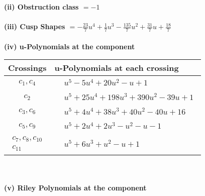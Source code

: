 \documentclass[1p]{elsarticle_modified}
\theoremstyle{definition}
\begin{document}
\flushleft \textbf{(ii) Obstruction class $= -1$}\\~\\
\flushleft \textbf{(iii) Cusp Shapes $= -\frac{23}{7} u^4+\frac{1}{7} u^3-\frac{135}{7} u^2+\frac{31}{7} u+\frac{18}{7}$}\\~\\
\newpage\renewcommand{\arraystretch}{1}
\flushleft \textbf{(iv) u-Polynomials at the component}\newline \\
\begin{tabular}{m{50pt}|m{274pt}}
Crossings & \hspace{64pt}u-Polynomials at each crossing \\
\hline $$\begin{aligned}c_{1},c_{4}\end{aligned}$$&$\begin{aligned}
&u^5-5 u^4+20 u^2- u+1
\end{aligned}$\\
\hline $$\begin{aligned}c_{2}\end{aligned}$$&$\begin{aligned}
&u^5+25 u^4+198 u^3+390 u^2-39 u+1
\end{aligned}$\\
\hline $$\begin{aligned}c_{3},c_{6}\end{aligned}$$&$\begin{aligned}
&u^5+4 u^4+38 u^3+40 u^2-40 u+16
\end{aligned}$\\
\hline $$\begin{aligned}c_{5},c_{9}\end{aligned}$$&$\begin{aligned}
&u^5+2 u^4+2 u^3- u^2- u-1
\end{aligned}$\\
\hline $$\begin{aligned}c_{7},c_{8},c_{10}\\c_{11}\end{aligned}$$&$\begin{aligned}
&u^5+6 u^3+u^2- u+1
\end{aligned}$\\
\hline
\end{tabular}\\~\\
\newpage\renewcommand{\arraystretch}{1}
\flushleft \textbf{(v) Riley Polynomials at the component}\newline \\
\end{document}
